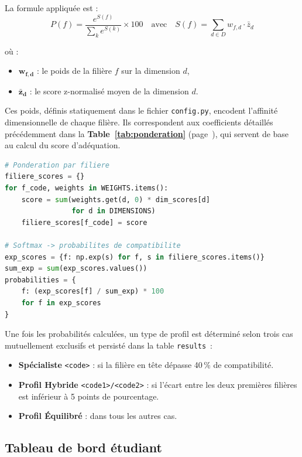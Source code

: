 \documentclass[a4paper,12pt]{article}
\begin{document}
La formule appliquée est :
\begin{equation}
    P(f) = \frac{e^{S(f)}}{\displaystyle\sum_{k} e^{S(k)}} \times 100
    \quad \text{avec} \quad
    S(f) = \sum_{d \in D} w_{f,d} \cdot \bar{z}_d
\end{equation}

où :
\begin{itemize}
    \item $\boldsymbol{w_{f,d}}$ : le poids de la filière $f$ sur la dimension $d$,
    \item $\boldsymbol{\bar{z}_d}$ : le score z-normalisé moyen de la dimension $d$.
\end{itemize}
Ces poids, définis statiquement dans le fichier \texttt{config.py}, encodent l'affinité dimensionnelle de chaque filière. Ils correspondent aux coefficients détaillés précédemment dans la \textbf{Table~\ref{tab:ponderation}} (page~\pageref{tab:ponderation}), qui servent de base au calcul du score d'adéquation.
\begin{lstlisting}[language=Python, caption={Calcul softmax des scores de compatibilité (api\_routes.py)},captionpos=b]
# Ponderation par filiere
filiere_scores = {}
for f_code, weights in WEIGHTS.items():
    score = sum(weights.get(d, 0) * dim_scores[d]
                for d in DIMENSIONS)
    filiere_scores[f_code] = score

# Softmax -> probabilites de compatibilite
exp_scores = {f: np.exp(s) for f, s in filiere_scores.items()}
sum_exp = sum(exp_scores.values())
probabilities = {
    f: (exp_scores[f] / sum_exp) * 100
    for f in exp_scores
}
\end{lstlisting}

Une fois les probabilités calculées, un type de profil est déterminé selon trois
cas mutuellement exclusifs et persisté dans la table \texttt{results}~:
\begin{itemize}
    \item \textbf{Spécialiste} \texttt{<code>} : si la filière en tête dépasse 40\,\%
          de compatibilité.
    \item \textbf{Profil Hybride} \texttt{<code1>/<code2>} : si l'écart entre les deux
          premières filières est inférieur à 5 points de pourcentage.
    \item \textbf{Profil Équilibré} : dans tous les autres cas.
\end{itemize}

\subsection{Tableau de bord étudiant}
\end{document}
